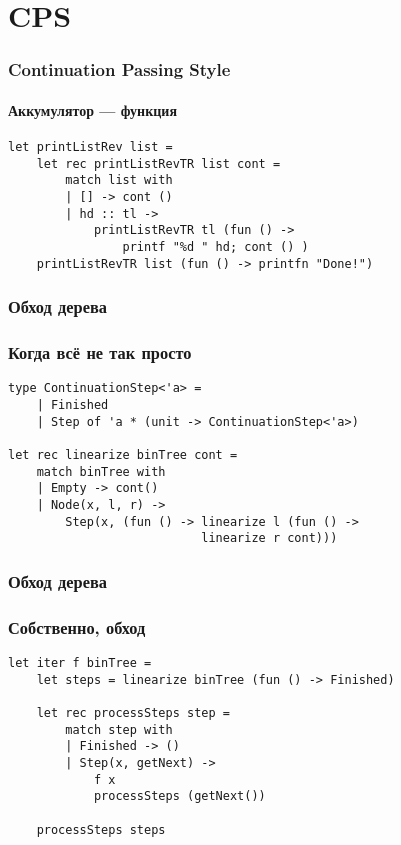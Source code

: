 \documentclass[xetex,mathserif,serif]{beamer}
\begin{document}
	\section{CPS}

	\begin{frame}[fragile]
		\frametitle{Continuation Passing Style}
		\framesubtitle{Аккумулятор --- функция}
		\begin{verbatim}
let printListRev list =
    let rec printListRevTR list cont =
        match list with
        | [] -> cont ()
        | hd :: tl ->
            printListRevTR tl (fun () -> 
                printf "%d " hd; cont () )
    printListRevTR list (fun () -> printfn "Done!")
		\end{verbatim}
	\end{frame}

	\begin{frame}[fragile]
		\frametitle{Обход дерева}
		\frametitle{Когда всё не так просто}
		\begin{verbatim}
type ContinuationStep<'a> =
    | Finished
    | Step of 'a * (unit -> ContinuationStep<'a>)

let rec linearize binTree cont =
    match binTree with
    | Empty -> cont()
    | Node(x, l, r) ->
        Step(x, (fun () -> linearize l (fun () -> 
                           linearize r cont)))
		\end{verbatim}
	\end{frame}

	\begin{frame}[fragile]
		\frametitle{Обход дерева}
		\frametitle{Собственно, обход}
		\begin{verbatim}
let iter f binTree =
    let steps = linearize binTree (fun () -> Finished)

    let rec processSteps step =
        match step with
        | Finished -> ()
        | Step(x, getNext) -> 
            f x
            processSteps (getNext())
    
    processSteps steps
		\end{verbatim}
	\end{frame}
\end{document}
